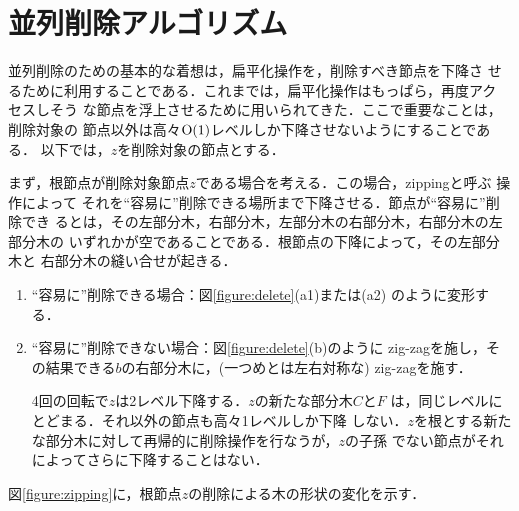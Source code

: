 \documentclass{compsoft}
\begin{document}
\section{並列削除アルゴリズム}\label{section:delete}

並列削除のための基本的な着想は，扁平化操作を，削除すべき節点を下降さ
せるために利用することである．これまでは，扁平化操作はもっぱら，再度アク
セスしそう
な節点を浮上させるために用いられてきた．ここで重要なことは，削除対象の
節点以外は高々${\rm O}(1)$レベルしか下降させないようにすることである．
以下では，$z$を削除対象の節点とする．

まず，根節点が削除対象節点$z$である場合を考える．この場合，zippingと呼ぶ
操作によって
それを``容易に''削除できる場所まで下降させる．節点が``容易に''削除でき
るとは，その左部分木，右部分木，左部分木の右部分木，右部分木の左部分木の
いずれかが空であることである．根節点の下降によって，その左部分木と
右部分木の縫い合せが起きる．
% 

\begin{enumerate}
\item[(a)]
``容易に''削除できる場合：図\ref{figure:delete}(a1)または(a2)
のように変形する．


\begin{figure*}[t]
\begin{center}
\end{center}
\caption{後続操作をブロックしない削除アルゴリズムの1ステップ}
\label{figure:delete}
\end{figure*}

\item[(b)]
``容易に''削除できない場合：図\ref{figure:delete}(b)のように
zig-zagを施し，そ
の結果できる$b$の右部分木に，(一つめとは左右対称な) zig-zagを施す．

\noindent
4回の回転で$z$は2レベル下降する．$z$の新たな部分木$C$と$F$
は，同じレベルにとどまる．それ以外の節点も高々1レベルしか下降
しない．$z$を根とする新たな部分木に対して再帰的に削除操作を行なうが，$z$の子孫
でない節点がそれによってさらに下降することはない．
\end{enumerate}

図\ref{figure:zipping}に，根節点$z$の削除による木の形状の変化を示す．
\begin{figure*}[t]
\begin{center}
\end{center}
\caption{Zippingによる節点$z$の削除}
\label{figure:zipping}
\end{figure*}
\end{document}
